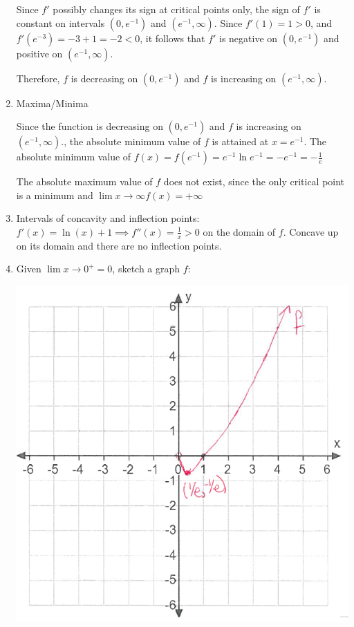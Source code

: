 \documentclass[nooutcomes]{ximera}
\begin{document}
\begin{problem}
\begin{freeResponse}
\begin{enumerate}
Since $f'$ possibly changes its sign at critical points only, the sign of $f'$ is constant on intervals $(0,e^{-1})$ and $(e^{-1},\infty)$. 
Since $f'(1)=1>0$, and $f'(e^{-3})=-3+1=-2<0$, it follows that $f'$ is negative on $(0,e^{-1})$ and positive on $(e^{-1},\infty)$. 

Therefore, $f$ is decreasing on $(0,e^{-1})$ and $f$ is increasing on $(e^{-1},\infty)$. 

\item  Maxima/Minima

Since the function is decreasing on $(0,e^{-1})$ and $f$ is increasing on $(e^{-1},\infty)$., the absolute minimum value of $f$ is attained at $x=e^{-1}$.  The absolute minimum value of $f(x)=f(e^{-1})=e^{-1}\ln e^{-1}=-e^{-1}=-\frac{1}{e}$

The absolute maximum value of $f$ does not exist, since the only critical point is a minimum and $\lim{x \to \infty}f(x)=+\infty$

\item Intervals of concavity and inflection points:
$f'(x)=\ln(x)+1 \implies f''(x)=\frac{1}{x}>0$ on the domain of $f$.  Concave up on its domain and there are no inflection points.

\item Given $\lim{x \to 0^+}=0$, sketch a graph $f$:
        \begin{image}
        \includegraphics[scale = .7]{figure7.png}
      \end{image}





\end{enumerate}
\end{freeResponse}
\end{problem}
\end{document}
